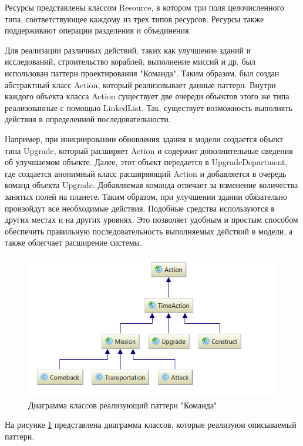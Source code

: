 Ресурсы представлены классом Resource, в котором три поля целочисленного типа, соответствующее каждому из трех типов ресурсов. Ресурсы также поддерживают операции разделения и объединения.

Для реализации различных действий, таких как улучшение зданий и исследований, строительство кораблей, выполнение миссий и др. был использован паттерн проектирования "Команда". Таким образом, был создан абстрактный класс Action, который реализовывает данные паттерн. Внутри каждого объекта класса Action существует две очереди объектов этого же типа реализованные с помощью LinkedList. Так, существует возможность выполнять действия в определенной последовательности. 

Например, при инициировании обновления здания в модели создается объект типа Upgrade, который расширяет Action и содержит дополнительные сведения об улучшаемом объекте. Далее, этот объект передается в UpgradeDepartment, где создается анонимный класс расширяющий Action и добавляется в очередь команд объекта Upgrade. Добавляемая команда отвечает за изменение количества занятых полей на планете. Таким образом, при улучшении здании обязательно произойдут все необходимые действия. Подобные средства используются в других местах и на других уровнях. Это позволяет удобным и простым способом обеспечить правильную последовательность выполняемых действий в модели, а также облегчает расширение системы. 

\begin{figure}[H]
\centering
\includegraphics[scale=0.5]{d3.png}
\caption{Диаграмма классов  реализующий паттерн "Команда"}
\label{pic:d3}
\end{figure}

На рисунке \ref{pic:d3} представлена диаграмма классов, которые реализуюи описываемый паттерн.

